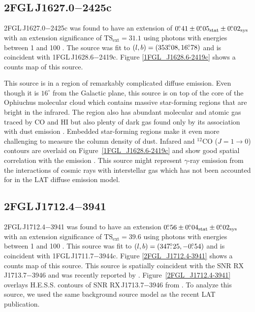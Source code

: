 \documentclass[12pt,preprint]{aastex}
\newcommand{\gev}{\text{GeV}\xspace}
\newcommand{\tev}{\text{TeV}\xspace}
\newcommand{\tsext}{{\ensuremath{\text{TS}_{\text{ext}}}}\xspace}
\newcommand{\sys}{\text{sys}\xspace}
\newcommand{\stat}{\text{stat}\xspace}
\newcommand{\degree}{^\circ\xspace}
\begin{document}
\subsection{2FGL\,J1627.0$-$2425c}
\label{section_2FGL_J1627.0-2425c}


2FGL\,J1627.0$-$2425c was found  to
have an extension of $0\fdg41\pm0\fdg05_\stat\pm0\fdg02_\sys$ with
an extension significance of $\tsext=31.1$
using photons with energies between 1 \gev and 100 \gev.  The source
was fit to
$(l,b)=(353\mbox{$.\!\!^\circ$}08, 16\mbox{$.\!\!^\circ$}78)$ and is coincident with 
1FGL\,J1628.6$-$2419c.  
Figure \ref{1FGL_J1628.6-2419c} shows a counts map of this source.

This source is in a region of remarkably complicated diffuse emission.
Even though it is $16\degree$ from the Galactic plane, this source is on
top of the core of the Ophiuchus molecular cloud which contains massive
star-forming regions that are bright in the infrared.  The region also has
abundant molecular and atomic gas traced by CO and HI but also plenty of
dark gas found only by its association with dust emission
\citep{isabelle_dark_gass}. Embedded star-forming regions make it even
more challenging to measure the column density of dust.  Infared and 
${}^{12}\text{CO}$ ($J=1\rightarrow 0$)
contours are overlaid on Figure~\ref{1FGL_J1628.6-2419c} and show good
spatial correlation with the \gev emission \citep{iras_rho_ophiuci,co_rho_ophiuci}.
This source might 
represent $\gamma$-ray emission from the interactions of cosmic rays with
interstellar gas which has not been accounted for in the LAT diffuse
emission model.

\subsection{2FGL\,J1712.4$-$3941}
\label{section_2FGL_J1712.4-3941}


2FGL\,J1712.4$-$3941 was found 
to have an extension $0\fdg56\pm0\fdg04_\stat\pm0\fdg02_\sys$
with an extension significance of $\tsext=39.6$
using 
photons with energies between
1 \gev and 100 \gev.  This source was
fit to $(l,b)=(347\mbox{$.\!\!^\circ$}25,-0\mbox{$.\!\!^\circ$}54)$ and is coincident
with 1FGL\,J1711.7$-$3944c.
Figure \ref{2FGL_J1712.4-3941} shows a counts map of this source.
This source is spatially coincident with the SNR RX\,J1713.7$-$3946
and was recently reported by \cite{rx_j1713_lat}.  
Figure~\ref{2FGL_J1712.4-3941} overlays H.E.S.S. \tev contours of SNR 
RX\,J1713.7$-$3946 from \cite{rx_j1713_hess}.  To analyze this source,
we used the same background source model as the recent LAT publication.
\end{document}
